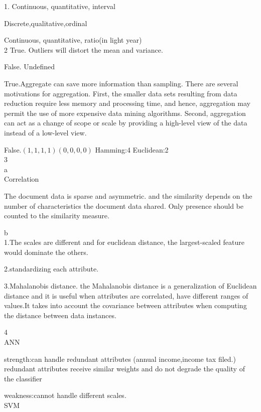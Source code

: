 \documentclass[12pt]{article}
\begin{document}
1.
Continuous, quantitative, interval

Discrete,qualitative,ordinal

Continuous, quantitative, ratio(in light year)\\

2
True. Outliers will distort the mean and variance.

False. Undefined

True.Aggregate can save more information than sampling. There are several motivations for aggregation. First, the smaller data sets
resulting from data reduction require less memory and processing time, and
hence, aggregation may permit the use of more expensive data mining algorithms.
Second, aggregation can act as a change of scope or scale by providing
a high-level view of the data instead of a low-level view.

False.$(1,1,1,1)  (0,0,0,0)$ Hamming:4 Euclidean:2\\

3\\

a\\

Correlation

The document data is sparse and asymmetric. and the similarity depends on the number of characteristics the document data shared.
Only presence should be counted to the similarity measure.

b\\

1.The scales are different and for euclidean distance, the largest-scaled feature would dominate the others.

2.standardizing each attribute.

3.Mahalanobis distance. the Mahalanobis distance is a generalization of Euclidean distance and it is useful when attributes are correlated, have different ranges of values.It takes into account the covariance between
attributes when computing the distance between data instances.

4\\

ANN

strength:can handle redundant attributes (annual income,income tax filed.)
redundant attributes receive similar weights and do not degrade the quality of the classifier


weakness:cannot handle different scales.\\

SVM
\end{document}
